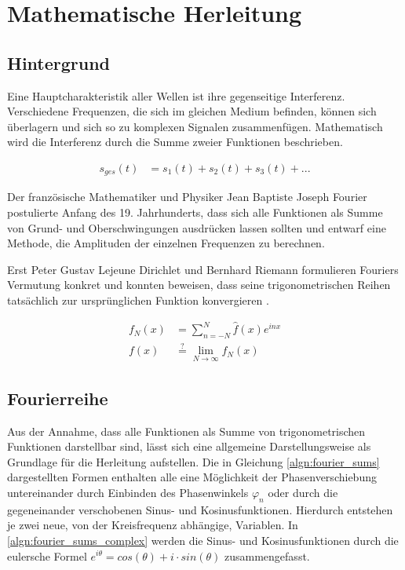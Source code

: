 
\section{Mathematische Herleitung}

\subsection{Hintergrund}
Eine Hauptcharakteristik aller Wellen ist ihre gegenseitige Interferenz. Verschiedene Frequenzen, die sich im gleichen Medium befinden, können sich überlagern und sich so zu komplexen Signalen zusammenfügen. Mathematisch wird die Interferenz durch die Summe zweier Funktionen beschrieben.

\begin{align}
  s_{ges}(t) &= s_1(t) + s_2(t) + s_3(t) + ...
\end{align}

Der französische Mathematiker und Physiker Jean Baptiste Joseph Fourier postulierte Anfang des 19. Jahrhunderts, dass sich alle Funktionen als Summe von Grund- und Oberschwingungen ausdrücken lassen sollten und entwarf eine Methode, die Amplituden der einzelnen Frequenzen zu berechnen.

Erst Peter Gustav Lejeune Dirichlet und Bernhard Riemann formulieren Fouriers Vermutung konkret und konnten beweisen, dass seine trigonometrischen Reihen tatsächlich zur ursprünglichen Funktion konvergieren \cite{art:konyagin00}.

\begin{align}
  f_N(x) &= \sum_{n=-N}^{N} \hat{f}(x) e^{i n x} \\
  f(x) &\overset{?}{=}\lim_{N \to \infty}{f_N(x)}
\end{align}

\subsection{Fourierreihe}
Aus der Annahme, dass alle Funktionen als Summe von trigonometrischen Funktionen darstellbar sind, lässt sich eine allgemeine Darstellungsweise als Grundlage für die Herleitung aufstellen.
Die in Gleichung \ref{algn:fourier_sums} dargestellten Formen enthalten alle eine Möglichkeit der Phasenverschiebung untereinander durch Einbinden des Phasenwinkels $ \varphi_n $ oder durch die gegeneinander verschobenen Sinus- und Kosinusfunktionen. Hierdurch entstehen je zwei neue, von der Kreisfrequenz abhängige, Variablen. In \ref{algn:fourier_sums_complex} werden die Sinus- und Kosinusfunktionen durch die eulersche Formel $ e^{i \theta} = cos(\theta) + i \cdot sin(\theta) $ zusammengefasst.

